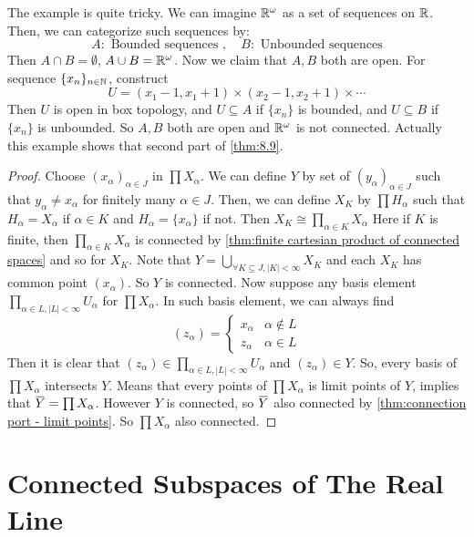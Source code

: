 \documentclass[12pt, a4paper, twoside]{article}
\newcommand{\overbar}[1]{\mkern 1.5mu\overline{\mkern-1.5mu#1\mkern-1.5mu}\mkern 1.5mu}
\theoremstyle{plain}
\begin{document}
The example is quite tricky. We can imagine ${\mathbb {R}}^\omega$ as a set of sequences on ${\mathbb {R}}$. 
Then, we can categorize such sequences by: 
\[A: \text{ Bounded sequences }, \quad B: \text{ Unbounded sequences}\]
Then $A \cap B = \emptyset$, $A \cup B = {\mathbb {R}}^{\omega}$. 
Now we claim that $A, B$ both are open. 
For sequence $\{x_n\}_{n \in {\mathbb {N}}}$, construct 
\[U = (x_1 - 1, x_1 + 1) \times (x_2 - 1, x_2 + 1) \times \cdots\]
Then $U$ is open in box topology, and $U \subseteq A$ if $\{x_n\}$ is bounded, and $U \subseteq B$ if $\{x_n\}$ is unbounded. 
So $A, B$ both are open and ${\mathbb {R}}^{\omega}$ is not connected. 
Actually this example shows that second part of \ref{thm:8.9}. 
\begin{proof}
    Choose $(x_\alpha)_{\alpha \in J}$ in $\prod X_\alpha$. 
    We can define $Y$ by set of $(y_\alpha)_{\alpha \in J}$ such that $y_\alpha \neq x_\alpha$ for finitely many $\alpha \in J$. 
    Then, we can define $X_K$ by $\prod H_\alpha$ such that $H_\alpha = X_\alpha$ if $\alpha \in K$ and $H_\alpha = \{x_\alpha\}$ if not. 
    Then $X_K \cong \prod_{\alpha \in K}X_\alpha$ Here if $K$ is finite, then $\prod_{\alpha \in K} X_\alpha$ is connected by \ref{thm:finite cartesian product of connected spaces} 
    and so for $X_K$. 
    Note that $Y = \bigcup_{\forall K \subseteq J, |K| < \infty} X_K$ and each $X_K$ has common point 
    $(x_\alpha)$. So $Y$ is connected. 
    Now suppose any basis element $\prod_{\alpha \in L, |L| < \infty} U_\alpha$ for $\prod X_\alpha$. 
    In such basis element, we can always find 
    \[(z_\alpha) = \begin{cases}
        x_\alpha & \alpha \notin L \\
        z_\alpha & \alpha \in L
    \end{cases}\]
    Then it is clear that $(z_\alpha) \in \prod_{\alpha \in L, |L| < \infty} U_\alpha$ and $(z_\alpha) \in Y$. 
    So, every basis of $\prod X_\alpha$ intersects $Y$. Means that every points of $\prod X_\alpha$ is limit points of $Y$, 
    implies that $\overbar{Y} = \prod X_\alpha$. However $Y$ is connected, so $\overbar{Y}$ also connected by \ref{thm:connection port - limit points}. 
    So $\prod X_\alpha$ also connected. 
\end{proof}

\newpage 

\section{Connected Subspaces of The Real Line}
\end{document}
